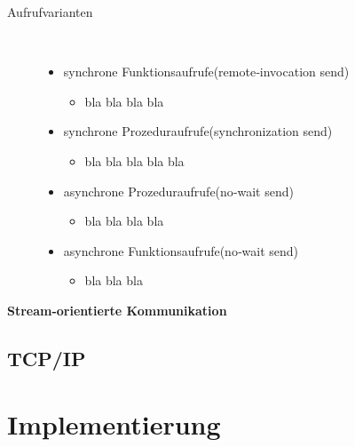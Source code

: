 \documentclass[a4paper,12pt]{article}
\begin{document}
\newpage
\noindent
\begin{description}
    \item[Aufrufvarianten] ~\par
    \begin{itemize}
        \item synchrone Funktionsaufrufe(remote‑invocation send)
        \begin{itemize}
            \item{bla bla bla bla}
        \end{itemize}
        \item synchrone Prozeduraufrufe(synchronization send)
        \begin{itemize}
            \item{bla bla bla bla bla}
        \end{itemize}
        \item asynchrone Prozeduraufrufe(no‑wait send)
        \begin{itemize}
            \item{bla bla bla bla}
        \end{itemize}
        \item asynchrone Funktionsaufrufe(no‑wait send)
        \begin{itemize}
            \item{bla bla bla\\}
        \end{itemize}
    \end{itemize} 
\end{description}
\textbf{Stream-orientierte Kommunikation}\\
\cite{communication2}
\subsection{TCP/IP}



\newpage
\noindent
\section{Implementierung}
\end{document}
